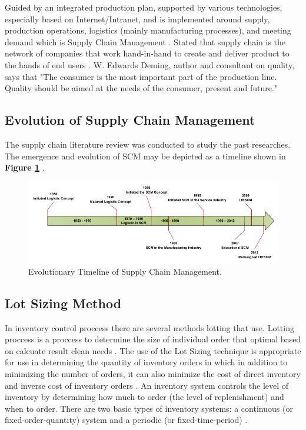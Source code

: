\documentclass[12pt,a4paper,final]{iopart}
\begin{document}
Guided by an integrated production plan, supported by various technologies, especially based on Internet/Intranet, and is implemented around supply, production operations, logistics (mainly manufacturing processes), and meeting demand which is Supply Chain Management \cite{Li2018}. Stated that supply chain is the network of companies that work hand-in-hand to create and deliver product to the hands of end users \cite{Sampouw}. W. Edwards Deming, author and consultant on quality, says that "The consumer is the most important part of the production line. Quality should be aimed at the needs of the consumer, present and future." \cite{Rusell2011}

\subsection{Evolution of Supply Chain Management}
The supply chain literature review was conducted to study the past researches. The emergence and evolution of SCM may be depicted as a timeline shown in \textbf{Figure \ref{figureEvolution}} \cite{Habib2019}.

\begin{figure}[htb!]
	\centering
	\includegraphics[width=1.0\textwidth]
		{evolution.png}
	\caption{\label{figureEvolution}Evolutionary Timeline of Supply Chain Management.}
\end{figure}

\subsection{Lot Sizing Method}

In inventory control proccess there are several methods lotting that use. Lotting proccess is a proccess to determine the size of individual order that optimal based on calcuate result clean needs \cite{Ibrahim}. The use of the Lot Sizing technique is appropriate for use in determining the quantity of inventory orders in which in addition to minimizing the number of orders, it can also minimize the cost of direct inventory and inverse cost of inventory orders \cite{Djunaidi2019}. An inventory system controls the level of inventory by determining how much to order (the level of replenishment) and when to order. There are two basic types of inventory systems: a continuous (or fixed-order-quantity) system and a periodic (or fixed-time-period) \cite{Rusell2011}. 
\end{document}
